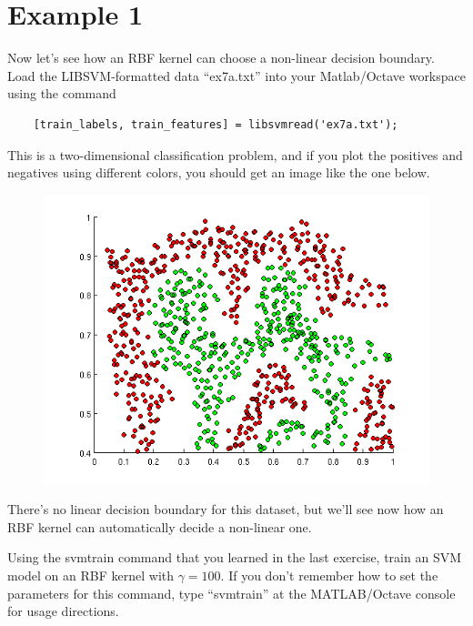 \documentclass[10pt,a4paper]{article}
\begin{document}
\section{Example 1}
%
  Now let's see how an RBF kernel can choose a non-linear decision boundary. Load the LIBSVM-formatted data ``ex7a.txt'' into your Matlab/Octave workspace using the command
  \begin{lstlisting}
    [train_labels, train_features] = libsvmread('ex7a.txt');
  \end{lstlisting}

  This is a two-dimensional classification problem, and if you plot the positives and negatives using different colors, you should get an image like the one below.
  \begin{figure}[htb!]
    \centering
      \includegraphics[width=.7\columnwidth]{ex8a_dataonly}
  \end{figure}
  There's no linear decision boundary for this dataset, but we'll see now how an RBF kernel can automatically decide a non-linear one.

  Using the svmtrain command that you learned in the last exercise, train an SVM model on an RBF kernel with $\gamma = 100$. If you don't remember how to set the parameters for this command, type ``svmtrain'' at the MATLAB/Octave console for usage directions.
\end{document}
